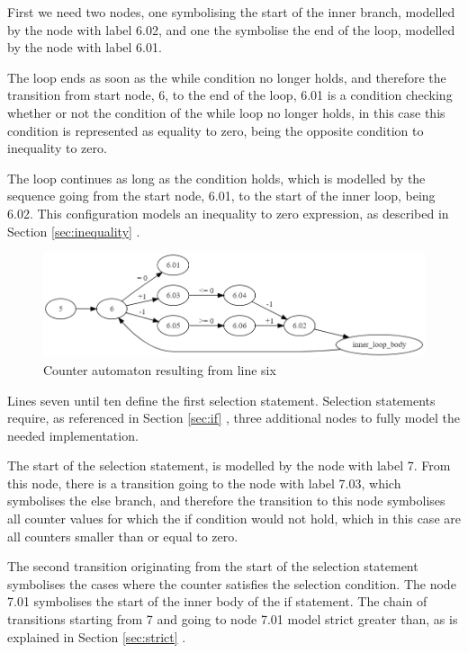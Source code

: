 \documentclass[12pt]{article}
\begin{document}
First we need two nodes, one symbolising the start of the inner branch, modelled by the node with label 6.02, and one the symbolise the end of the loop, modelled by the node with label 6.01.

The loop ends as soon as the while condition no longer holds, and therefore the transition from start node, 6, to the end of the loop, 6.01 is a condition checking whether or not the condition of the while loop no longer holds, in this case this condition is represented as equality to zero, being the opposite condition to inequality to zero. 

The loop continues as long as the condition holds, which is modelled by the sequence going from the start node, 6.01, to the start of the inner loop, being 6.02. This configuration models an inequality to zero expression, as described in Section \ref{sec:inequality} .

\begin{figure}[h]
	\centering
	\includegraphics[width=\linewidth]{final_overview_6}
	\caption{Counter automaton resulting from line six}
	\label{fig:final_overview_6}
\end{figure}

Lines seven until ten define the first selection statement. Selection statements require, as referenced in Section \ref{sec:if} , three additional nodes to fully model the needed implementation.

The start of the selection statement, is modelled by the node with label 7. From this node, there is a transition going to the node with label 7.03, which symbolises the else branch, and therefore the transition to this node symbolises all counter values for which the if condition would not hold, which in this case are all counters smaller than or equal to zero.

The second transition originating from the start of the selection statement symbolises the cases where the counter satisfies the selection condition. The node 7.01 symbolises the start of the inner body of the if statement. The chain of transitions starting from 7 and going to node 7.01 model strict greater than, as is explained in Section \ref{sec:strict} .
\end{document}
